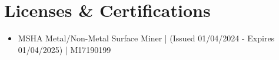\documentclass[12pt,a4paper,sans]{moderncv}
\begin{document}
\section{Licenses \& Certifications}
\vspace{-2mm}
{\begin{itemize}[label=\textbullet]
      \item MSHA Metal/Non-Metal Surface Miner | (Issued 01/04/2024 - Expires 01/04/2025) | M17190199 
  \end{itemize}} 


\end{document}
